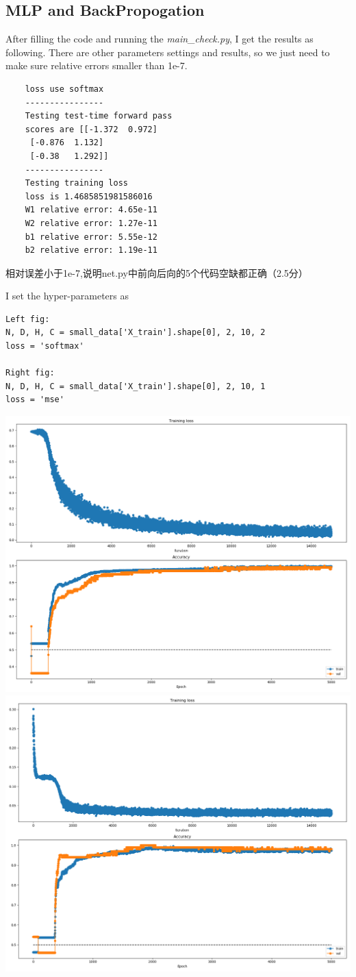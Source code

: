 \documentclass[12pt]{article}
\begin{document}
\subsection{MLP and BackPropogation}

After filling the code and running the \textit{main\_check.py}, I get the results as following. There are other parameters settings and results, so we just need to make sure relative errors smaller than 1e-7.

\begin{verbatim}
	loss use softmax
	----------------
	Testing test-time forward pass
	scores are [[-1.372  0.972]
	 [-0.876  1.132]
	 [-0.38   1.292]]
	----------------
	Testing training loss
	loss is 1.4685851981586016
	W1 relative error: 4.65e-11
	W2 relative error: 1.27e-11
	b1 relative error: 5.55e-12
	b2 relative error: 1.19e-11	
\end{verbatim}

相对误差小于1e-7,说明net.py中前向后向的5个代码空缺都正确（2.5分）

I set the hyper-parameters as
\begin{verbatim}
Left fig: 
N, D, H, C = small_data['X_train'].shape[0], 2, 10, 2
loss = 'softmax'

Right fig:
N, D, H, C = small_data['X_train'].shape[0], 2, 10, 1
loss = 'mse'
\end{verbatim}

\begin{center}
	\includegraphics[width=.49\textwidth]{fig/2018-04-02-15-16-43.png}
	\includegraphics[width=.49\textwidth]{fig/2018-04-02-15-15-07.png}
\end{center}
\end{document}
